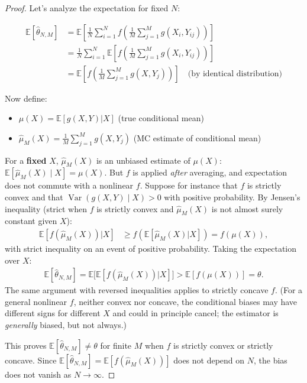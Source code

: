 \begin{notechapter}
\begin{proof}
Let's analyze the expectation for fixed $N$:

\begin{align*}
\mathbb{E}[\hat{\theta}_{N,M}] &= \mathbb{E}\left[\frac{1}{N} \sum_{i=1}^N f\left(\frac{1}{M} \sum_{j=1}^M g(X_i, Y_{ij})\right)\right] \\
&= \frac{1}{N} \sum_{i=1}^N \mathbb{E}\left[f\left(\frac{1}{M} \sum_{j=1}^M g(X_i, Y_{ij})\right)\right] \\
&= \mathbb{E}\left[f\left(\frac{1}{M} \sum_{j=1}^M g(X, Y_j)\right)\right] \quad \text{(by identical distribution)}
\end{align*}

Now define:
\begin{itemize}
\item $\mu(X) = \mathbb{E}[g(X,Y)|X]$ (true conditional mean)
\item $\hat{\mu}_M(X) = \frac{1}{M} \sum_{j=1}^M g(X, Y_j)$ (MC estimate of conditional mean)
\end{itemize}

For a \textbf{fixed} $X$, $\hat{\mu}_M(X)$ is an unbiased estimate of $\mu(X)$:
$\mathbb{E}[\hat{\mu}_M(X) \mid X] = \mu(X)$. But $f$ is applied \emph{after} averaging, and
expectation does not commute with a nonlinear $f$. Suppose for instance that $f$ is strictly convex
and that $\operatorname{Var}(g(X,Y)\mid X) > 0$ with positive probability. By Jensen's inequality (strict
when $f$ is strictly convex and $\hat{\mu}_M(X)$ is not almost surely constant given $X$):
\begin{align*}
\mathbb{E}[f(\hat{\mu}_M(X)) | X] &\geq f(\mathbb{E}[\hat{\mu}_M(X) | X]) = f(\mu(X)),
\end{align*}
with strict inequality on an event of positive probability. Taking the expectation over $X$:
\begin{align*}
\mathbb{E}[\hat{\theta}_{N,M}] = \mathbb{E}\big[\mathbb{E}[f(\hat{\mu}_M(X)) | X]\big]
> \mathbb{E}[f(\mu(X))] = \theta .
\end{align*}
The same argument with reversed inequalities applies to strictly concave $f$. (For a general nonlinear
$f$, neither convex nor concave, the conditional biases may have different signs for different $X$ and
could in principle cancel; the estimator is \emph{generally} biased, but not always.)

This proves $\mathbb{E}[\hat{\theta}_{N,M}] \neq \theta$ for finite $M$ when $f$ is strictly convex or strictly concave. Since $\mathbb{E}[\hat{\theta}_{N,M}] = \mathbb{E}[f(\hat{\mu}_M(X))]$ does not depend on $N$, the bias does not vanish as $N \to \infty$.
\end{proof}


\end{notechapter}

